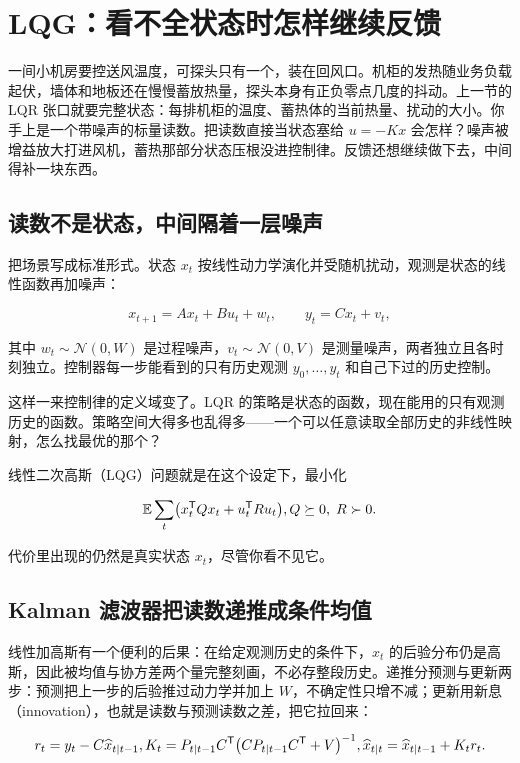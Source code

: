 \section{LQG：看不全状态时怎样继续反馈}
\label{sec:16-Control-and-Reinforcement-Learning/01-Optimal-Control/05}

一间小机房要控送风温度，可探头只有一个，装在回风口。机柜的发热随业务负载起伏，墙体和地板还在慢慢蓄放热量，探头本身有正负零点几度的抖动。上一节的 LQR 张口就要完整状态：每排机柜的温度、蓄热体的当前热量、扰动的大小。你手上是一个带噪声的标量读数。把读数直接当状态塞给 \(u=-Kx\) 会怎样？噪声被增益放大打进风机，蓄热那部分状态压根没进控制律。反馈还想继续做下去，中间得补一块东西。

\subsection{读数不是状态，中间隔着一层噪声}

把场景写成标准形式。状态 \(x_t\) 按线性动力学演化并受随机扰动，观测是状态的线性函数再加噪声：

\[
x_{t+1} = A x_t + B u_t + w_t, \qquad y_t = C x_t + v_t,
\]

其中 \(w_t \sim \mathcal{N}(0, W)\) 是过程噪声，\(v_t \sim \mathcal{N}(0, V)\) 是测量噪声，两者独立且各时刻独立。控制器每一步能看到的只有历史观测 \(y_0,\dots,y_t\) 和自己下过的历史控制。

这样一来控制律的定义域变了。LQR 的策略是状态的函数，现在能用的只有观测历史的函数。策略空间大得多也乱得多——一个可以任意读取全部历史的非线性映射，怎么找最优的那个？

线性二次高斯（LQG）问题就是在这个设定下，最小化

\[
\mathbb{E} \sum_{t} \bigl( x_t^{\mathsf{T}} Q x_t + u_t^{\mathsf{T}} R u_t \bigr),
\space Q \succeq 0,\; R \succ 0 .
\]

代价里出现的仍然是真实状态 \(x_t\)，尽管你看不见它。

\subsection{Kalman 滤波器把读数递推成条件均值}

线性加高斯有一个便利的后果：在给定观测历史的条件下，\(x_t\) 的后验分布仍是高斯，因此被均值与协方差两个量完整刻画，不必存整段历史。递推分预测与更新两步：预测把上一步的后验推过动力学并加上 \(W\)，不确定性只增不减；更新用新息（innovation），也就是读数与预测读数之差，把它拉回来：

\[
r_t = y_t - C\widehat x_{t\mid t-1},
\space
K_t = P_{t\mid t-1} C^{\mathsf{T}}
\bigl( C P_{t\mid t-1} C^{\mathsf{T}} + V \bigr)^{-1},
\space
\widehat x_{t\mid t} = \widehat x_{t\mid t-1} + K_t r_t .
\]

